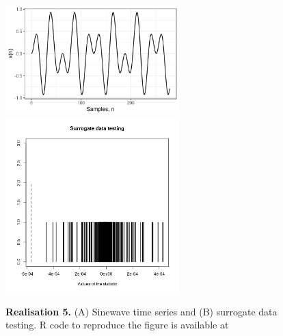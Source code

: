 \documentclass[11pt]{article}
\newcommand{\R}{\textsf{R}\xspace}
\newcommand{\codeicon}{{\color{linkcolor}\faFileCodeO}}
\newcommand{\codelink}[1]{\href{#1}{\codeicon}}
\begin{document}
\begin{figure}
\centering
\includegraphics[width=0.6\textwidth]{r5_ts_sinewaves_window_length_278} %
\includegraphics[width=0.6\textwidth]{r5_sdt_sinewaves_window_length_278} %
    \caption[]{
	{\bf Realisation 5.}
	(A) Sinewave time series and (B) surrogate data testing.
	\R code to reproduce the figure is available at 
	\codelink{https://github.com/mxochicale-phd/thesis/blob/master/0_code_data/1_code/x_surrogate/00_timeseries/code/B_.R}
}
    \label{fig:thesis-outline}
\end{figure}
\end{document}
